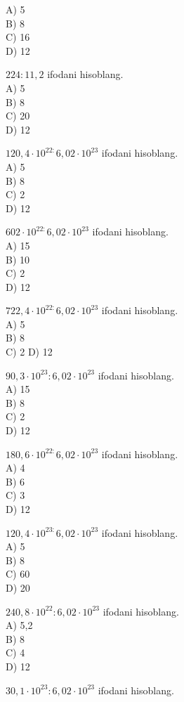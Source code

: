 A) 5\\
B) 8\\
C) 16\\
D) 12
  \item $224: 11,2$ ifodani hisoblang.\\
A) 5\\
B) 8\\
C) 20\\
D) 12
  \item $120,4 \cdot 10^{22:} 6,02 \cdot 10^{23}$ ifodani hisoblang.\\
A) 5\\
B) 8\\
C) 2\\
D) 12
  \item $602 \cdot 10^{22:} 6,02 \cdot 10^{23}$ ifodani hisoblang.\\
A) 15\\
B) 10\\
C) 2\\
D) 12
  \item $722,4 \cdot 10^{22:} 6,02 \cdot 10^{23}$ ifodani hisoblang.\\
A) 5\\
B) 8\\
C) 2 
D) 12
  \item $90,3 \cdot 10^{23}: 6,02 \cdot 10^{23}$ ifodani hisoblang.\\
A) 15\\
B) 8\\
C) 2\\
D) 12
  \item $180,6 \cdot 10^{22:} 6,02 \cdot 10^{23}$ ifodani hisoblang.\\
A) 4\\
B) 6\\
C) 3\\
D) 12
  \item $120,4 \cdot 10^{23:} 6,02 \cdot 10^{23}$ ifodani hisoblang.\\
A) 5\\
B) 8\\
C) 60\\
D) 20
  \item $240,8 \cdot 10^{22}: 6,02 \cdot 10^{23}$ ifodani hisoblang.\\
A) 5,2\\
B) 8\\
C) 4\\
D) 12
  \item $30,1 \cdot 10^{23}: 6,02 \cdot 10^{23}$ ifodani hisoblang.\\
